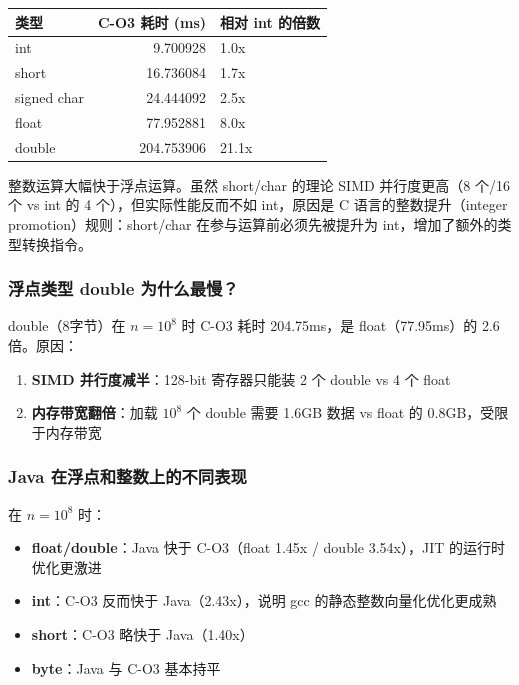 \documentclass[12pt,a4paper]{article}
\begin{document}
\begin{table}[H]
\centering
\begin{tabular}{l r l}
\toprule
类型 & C-O3 耗时 (ms) & 相对 int 的倍数 \\
\midrule
int         & 9.700928    & 1.0x  \\
short       & 16.736084   & 1.7x  \\
signed char & 24.444092   & 2.5x  \\
float       & 77.952881   & 8.0x  \\
double      & 204.753906  & 21.1x \\
\bottomrule
\end{tabular}
\end{table}

整数运算大幅快于浮点运算。虽然 short/char 的理论 SIMD 并行度更高（8 个/16 个 vs int 的 4 个），但实际性能反而不如 int，原因是 C 语言的整数提升（integer promotion）规则：short/char 在参与运算前必须先被提升为 int，增加了额外的类型转换指令。

\subsubsection*{浮点类型 double 为什么最慢？}

double（8字节）在 $n=10^8$ 时 C-O3 耗时 204.75ms，是 float（77.95ms）的 2.6 倍。原因：
\begin{enumerate}
  \item \textbf{SIMD 并行度减半}：128-bit 寄存器只能装 2 个 double vs 4 个 float
  \item \textbf{内存带宽翻倍}：加载 $10^8$ 个 double 需要 1.6GB 数据 vs float 的 0.8GB，受限于内存带宽
\end{enumerate}

\subsubsection*{Java 在浮点和整数上的不同表现}

在 $n=10^8$ 时：
\begin{itemize}
  \item \textbf{float/double}：Java 快于 C-O3（float 1.45x / double 3.54x），JIT 的运行时优化更激进
  \item \textbf{int}：C-O3 反而快于 Java（2.43x），说明 gcc 的静态整数向量化优化更成熟
  \item \textbf{short}：C-O3 略快于 Java（1.40x）
  \item \textbf{byte}：Java 与 C-O3 基本持平
\end{itemize}
\end{document}
